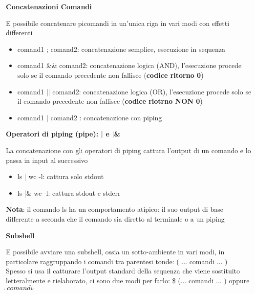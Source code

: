 \begin{flushleft}
  \textbf{Concatenazioni Comandi}\par 
  \ac{E} possibile concatenare pi\acu comandi in un'unica riga in vari modi con effetti differenti 
  \begin{itemize}
    \item comand1 ; comand2: concatenazione semplice, esecuzione in sequenza
    \item comand1 \&\& comand2: concatenazione logica (AND), l'esecuzione procede solo 
          se il comando precedente non fallisce (\textbf{codice ritorno 0})
    \item comand1 || comand2: concatenazione logica (OR), l'esecuzione procede solo 
          se il comando precedente non fallisce (\textbf{codice riotrno NON 0})
    \item comand1 | comand2 : concatenazione con piping
  \end{itemize}
\end{flushleft}
\begin{flushleft}
  \textbf{Operatori di piping (pipe): | e |\&} \par 
  La concatenazione con gli operatori di piping  cattura l'output di un comando e 
  lo passa in input al successivo 
  \begin{itemize}
    \item ls | wc -l: cattura solo stdout
    \item ls |\& wc -l: cattura stdout e stderr
  \end{itemize}
  \textbf{Nota}: il comando ls ha un comportamento atipico: il suo output di base \ace differente 
  a seconda che il comando sia diretto al terminale o a un piping
\end{flushleft}
\begin{flushleft}
  \textbf{Subshell}\par 
  \ac{E} possibile avviare  una subshell, ossia un sotto-ambiente in vari modi, in 
  particolare raggruppando i comandi tra parentesi tonde: ( ... comandi ... )\\
  Spesso si usa il catturare l'output standard della sequenza che viene sostituito letteralmente 
  e rielaborato, ci sono due modi per farlo: \$ (... comandi ... ) oppure $\grave{} \, comandi \,\, \grave{}$
\end{flushleft}

